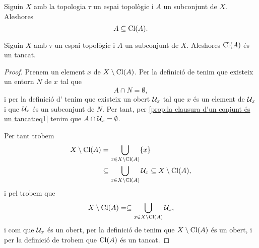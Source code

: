 \documentclass[../Apunts.tex]{subfiles}
\begin{document}
	\begin{observation}
		\label{obs:la clausura d'un conjunt conté el conjunt}
		Siguin \(X\) amb la topologia \(\tau\) un espai topològic i \(A\) un subconjunt de \(X\). Aleshores
		\[A\subseteq\operatorname{Cl}(A).\]
	\end{observation}
	\begin{proposition}
		\label{prop:la clausura d'un conjunt és un tancat}
		Siguin \(X\) amb \(\tau\) un espai topològic i \(A\) un subconjunt de \(X\). Aleshores \(\operatorname{Cl}(A)\) és un tancat.
		\begin{proof}
			 Prenem un element \(x\) de \(X\setminus\operatorname{Cl}(A)\). Per la definició de  tenim que existeix un entorn \(N\) de \(x\) tal que
			 \begin{equation}
			 	\label{prop:la clausura d'un conjunt és un tancat:eq1}
				 A\cap N=\emptyset,
			 \end{equation}
			 i per la definició d' tenim que existeix un obert \(\mathcal{U}_{x}\) tal que \(x\) és un element de \(\mathcal{U}_{x}\) i que \(\mathcal{U}_{x}\) és un subconjunt de \(N\). Per tant, per \eqref{prop:la clausura d'un conjunt és un tancat:eq1} tenim que \(A\cap\mathcal{U}_{x}=\emptyset\).
			 
			 Per tant trobem
			 \begin{align*}
				 X\setminus\operatorname{Cl}(A)&=\bigcup_{x\in X\setminus\operatorname{Cl}(A)}\{x\} \\
				 &\subseteq\bigcup_{x\in X\setminus\operatorname{Cl}(A)}\mathcal{U}_{x}\subseteq X\setminus\operatorname{Cl}(A),
			 \end{align*}
			 i pel  trobem que
			 \[X\setminus\operatorname{Cl}(A)=\subseteq\bigcup_{x\in X\setminus\operatorname{Cl}(A)}\mathcal{U}_{x},\]
			 i com que \(\mathcal{U}_{x}\) és un obert, per la definició de  tenim que \(X\setminus\operatorname{Cl}(A)\) és un obert, i per la definició de  trobem que \(\operatorname{Cl}(A)\) és un tancat.
		\end{proof}
	\end{proposition}
\end{document}
